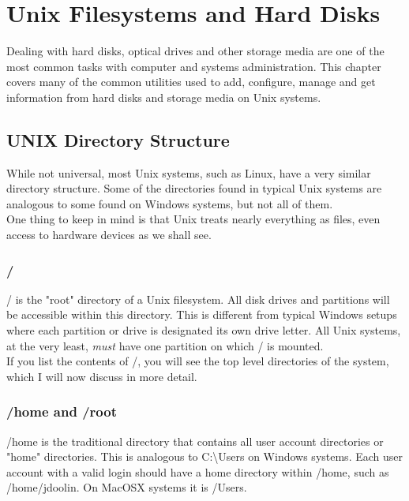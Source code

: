 \chapter{Unix Filesystems and Hard Disks}

Dealing with hard disks, optical drives and other storage media are one of the most common tasks with computer and systems administration.  This chapter covers many of the common utilities used to add, configure, manage and get information from hard disks and storage media on Unix systems.

\section{UNIX Directory Structure}

While not universal, most Unix systems, such as Linux, have a very similar directory structure.  Some of the directories found in typical Unix systems are analogous to some found on Windows systems, but not all of them.\\

One thing to keep in mind is that Unix treats nearly everything as files, even access to hardware devices as we shall see.

\subsection{/}

/ is the "root" directory of a Unix filesystem.  All disk drives and partitions will be accessible within this directory.  This is different from typical Windows setups where each partition or drive is designated its own drive letter.  All Unix systems, at the very least, \textit{must} have one partition on which / is mounted.\\

If you list the contents of /, you will see the top level directories of the system, which I will now discuss in more detail.

\subsection{/home and /root}

/home is the traditional directory that contains all user account directories or "home" directories.  This is analogous to C:\textbackslash Users on Windows systems.  Each user account with a valid login should have a home directory within /home, such as /home/jdoolin.  On MacOSX systems it is /Users.\\

